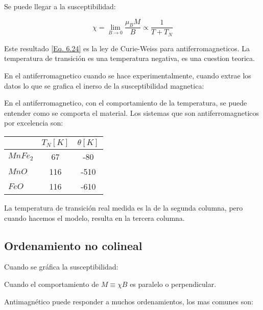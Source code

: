 \documentclass[11pt,fleqn]{book}
\begin{document}
Se puede llegar a la susceptibilidad:

\begin{equation}
    \chi=\lim_{B\longrightarrow0}\frac{\mu_{B}M}{B}\propto\frac{1}{T+T_{N}}
    \label{Eq. 6.24}
\end{equation}

Este resultado \ref{Eq. 6.24} es la ley de Curie-Weiss para antiferromagneticos. La temperatura de transición es una temperatura negativa, es una cuestion teorica. 




En el antiferromagnetico cuando se hace experimentalmente, cuando extrae los datos lo que se grafica el inerso de la susceptibilidad magnetica:



En el antiferromagnetico, con el comportamiento de la temperatura, se puede entender como se comporta el material. Los sistemas que son antiferromagneticos por excelencia son:


\begin{table}[H]
\centering
\begin{tabular}{lcc}
\hline
           & $T_{N}[K]$ & $\theta [K]$ \\ \hline
$MnFe_{2}$ & 67         & -80          \\
$MnO$      & 116        & -510         \\
$FeO$      & 116        & -610         \\ \hline
\end{tabular}
\end{table}

La temperatura de transición real medida es la de la segunda columna, pero cuando hacemos el modelo, resulta en la tercera columna. 

\subsection{Ordenamiento no colineal}


Cuando se gráfica la susceptibilidad:


Cuando el comportamiento de $M\equiv\chi B$ es paralelo o perpendicular.

Antimagnético puede responder a muchos ordenamientos, los mas comunes son:
\end{document}
